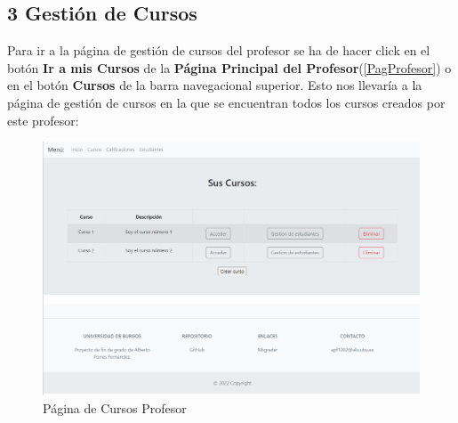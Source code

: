 \subsection{3 Gestión de Cursos}
Para ir a la página de gestión de cursos del profesor se ha de hacer click en el botón \textbf{Ir a mis Cursos} de la \textbf{Página Principal del Profesor}(\ref{PagProfesor}) o en el botón \textbf{Cursos} de la barra navegacional superior. Esto nos llevaría a la página de gestión de cursos en la que se encuentran todos los cursos creados por este profesor:
\begin{figure}[H]
\centering
\includegraphics[width=\textwidth]{img/imgs-memoria/PaginaCursosProfesor.PNG}
\caption{Página de Cursos Profesor}
\label{PagCursosProfesor}
\end{figure}

